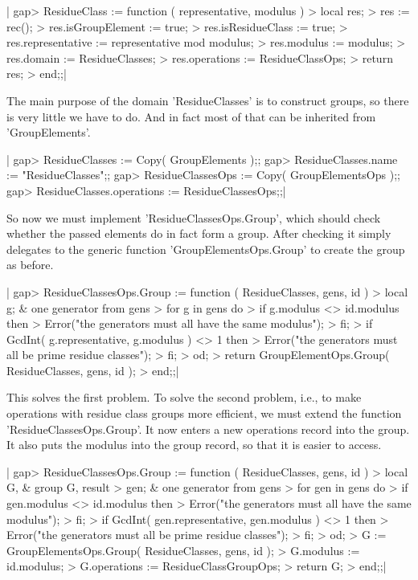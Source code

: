|    gap> ResidueClass := function ( representative, modulus )
    >     local res;
    >     res := rec();
    >     res.isGroupElement  := true;
    >     res.isResidueClass  := true;
    >     res.representative  := representative mod modulus;
    >     res.modulus         := modulus;
    >     res.domain          := ResidueClasses;
    >     res.operations      := ResidueClassOps;
    >     return res;
    > end;;|

The main  purpose of the domain 'ResidueClasses'  is to construct groups,
so there is very little we have to do.  And  in fact most  of that can be
inherited from 'GroupElements'.

|    gap> ResidueClasses := Copy( GroupElements );;
    gap> ResidueClasses.name := "ResidueClasses";;
    gap> ResidueClassesOps := Copy( GroupElementsOps );;
    gap> ResidueClasses.operations := ResidueClassesOps;;|

So now  we must implement  'ResidueClassesOps.Group',  which should check
whether the passed elements  do in fact form a  group.  After checking it
simply delegates   to the  generic  function 'GroupElementsOps.Group'  to
create the group as before.

|    gap> ResidueClassesOps.Group := function ( ResidueClasses, gens, id )
    >     local   g;          & one generator from gens
    >     for g  in gens  do
    >         if g.modulus <> id.modulus  then
    >             Error("the generators must all have the same modulus");
    >         fi;
    >         if GcdInt( g.representative, g.modulus ) <> 1  then
    >           Error("the generators must all be prime residue classes");
    >         fi;
    >     od;
    >     return GroupElementOps.Group( ResidueClasses, gens, id );
    > end;;|

This solves  the first problem.   To solve the second problem,   i.e., to
make operations with residue class  groups more efficient, we must extend
the function  'ResidueClassesOps.Group'.  It now  enters a new operations
record into the group.  It  also puts the  modulus into the group record,
so that it is easier to access.

|    gap> ResidueClassesOps.Group := function ( ResidueClasses, gens, id )
    >     local   G,          & group G, result
    >             gen;        & one generator from gens
    >     for gen  in gens  do
    >         if gen.modulus <> id.modulus  then
    >             Error("the generators must all have the same modulus");
    >         fi;
    >         if GcdInt( gen.representative, gen.modulus ) <> 1  then
    >           Error("the generators must all be prime residue classes");
    >         fi;
    >     od;
    >     G := GroupElementsOps.Group( ResidueClasses, gens, id );
    >     G.modulus    := id.modulus;
    >     G.operations := ResidueClassGroupOps;
    >     return G;
    > end;;|

